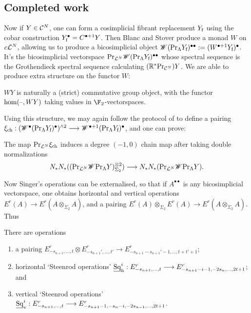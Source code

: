 \documentclass[11pt]{article}
\newcommand{\Sq}{\mathrm{Sq}}
\begin{document}
\subsection{Completed work}
Now if $Y\in\mathcal{C}^N$, one can form a cosimplicial fibrant replacement $Y_\textup{f}$ using the cobar construction $Y_\textup{f}^\bullet=C^{\bullet+1}Y$. Then Blanc and Stover produce a monad $W$ on $c\mathcal{L}^N$, allowing us to produce a bicosimplicial object $\mathscr{W}(\textup{Pr}_{\Lambda}Y_\textup{f})^{\bullet\bullet}:= (W^{\bullet+1}Y_\textup{f})^\bullet$. It's the bicosimplicial vectorspace $\textup{Pr}_{\mathcal{L}^N} \mathscr{W}(\textup{Pr}_{\Lambda}Y_\textup{f})^{\bullet\bullet}$ whose spectral sequence is the Grothendieck spectral sequence calculating $(\mathbb{R}^*\textup{Pr}_{\mathcal{C}^N})Y$. We are able to produce extra structure on the functor $W$:
\begin{prop}
$WY$ is naturally a (strict) commutative group object, with the functor $\hom(\textup{--},WY)$ taking values in $\ensuremath{\F_2}$-vectorspaces.
\end{prop}
Using this structure, we may again follow the protocol of \cite[\S5]{MR1089001} to define a pairing $\xi_\textup{ch}:(\mathscr{W}^{\bullet} (\textup{Pr}_\Lambda Y_\textup{f})^\bullet)^{\wedge 2}\longrightarrow \mathscr{W}^{\bullet+1} (\textup{Pr}_\Lambda Y_\textup{f})^\bullet$, and one can prove:
\begin{prop}
The map $\textup{Pr}_{\mathcal{L}^N}\xi_\textup{ch}$ induces a degree $(-1,0)$ chain map after taking double normalizations
\[ N_*N_*((\textup{Pr}_{\mathcal{L}^N}\mathscr{W}\textup{Pr}_\Lambda Y)^{\otimes2}_{\Sigma_2})\longrightarrow N_*N_*(\textup{Pr}_{\mathcal{L}^N}\mathscr{W}\textup{Pr}_\Lambda Y).\]
\end{prop}
Now Singer's operations can be externalised, so that if $A^{\bullet\bullet}$ is any bicosimplicial vectorspace, one obtains horizontal and vertical operations $E^r(A)\to E^r(A\otimes_{\Sigma_2}A)$, and a pairing $E^r(A)\otimes_{\Sigma_2}E^r(A)\to E^r(A\otimes_{\Sigma_2}A)$. Thus
\begin{cor}\label{opns-on-whole-gss}
There are operations
\begin{enumerate}\squishlist
\setlength{\parindent}{.25in}
\item a pairing $E^r_{-s_{n+1},\ldots,t}\otimes E^r_{-s_{n+1}',\ldots,t'}\to E^r_{-s_{n+1}-s_{n+1}'-1,\ldots,t+t'+1}$;
\item horizontal `Steenrod operations' $\underline{\Sq}^i_\textup{h}:E^r_{-s_{n+1},\ldots,t}\to E^r_{-s_{n+1}-i-1,-2s_{n},\ldots,2t+1}$; and
\item vertical `Steenrod operations' $\underline{\Sq}^i_\textup{v}:E^r_{-s_{n+1},\ldots,t}\to E^r_{-s_{n+1}-1,-s_{n}-i,-2s_{n-1},\ldots,2t+1}$.
\end{enumerate}
\end{cor}
\end{document}
